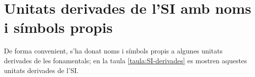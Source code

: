  
      
       
       
                    \index{\unit{\micro\noop}}   


\section{Unitats derivades de l'SI amb noms i símbols propis}
\label{sec:unitats-derv-SI}

De forma convenient, s'ha donat noms i símbols propis a algunes unitats derivades de les fonamentals; en la taula \vref{taula:SI-derivades} es mostren aquestes unitats derivades de l'SI.

